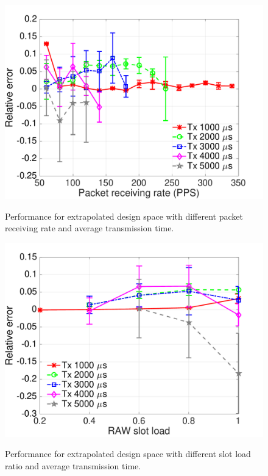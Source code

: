 
 \begin{figure}[t]
    \centering
{\includegraphics[width=0.8\columnwidth]{figures/avg_result_Prate_tx_extend_08}}
  \caption{Performance for extrapolated design space with different packet receiving rate and average transmission time. \label{fig:results-extended-prate}}
\end{figure}


 \begin{figure}[t]
    \centering
{\includegraphics[width=0.8\columnwidth]{figures/avg_result_load_tx_extended_08}}
  \caption{Performance for extrapolated design space with different slot load ratio and average transmission time. \label{fig:results-extended-load}}
\end{figure}


